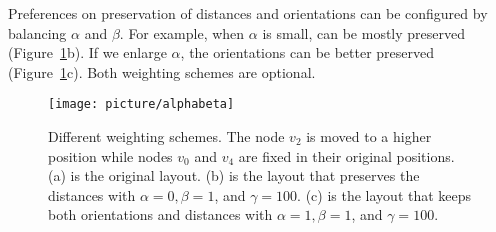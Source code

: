 Preferences on preservation of distances and orientations can be configured by balancing $\alpha$ and $\beta$. For example, when $\alpha$ is small,  can be mostly preserved (Figure~\ref{fig:alphabeta}b). If we enlarge $\alpha$, the orientations can be better preserved (Figure~\ref{fig:alphabeta}c). Both weighting schemes are optional.

\begin{figure}[t!p]
    \centering
    \setlength{\belowcaptionskip}{-5pt}
    \texttt{[image: picture/alphabeta]}
    \caption{Different weighting schemes. The node $v_2$ is moved to a higher position while nodes $v_0$ and $v_4$ are fixed in their original positions. (a) is the original layout. (b) is the layout that preserves the distances with $\alpha=0, \beta=1$, and $\gamma=100$. (c) is the layout that keeps both orientations and distances with $\alpha=1, \beta=1$, and $\gamma=100$.}
    \label{fig:alphabeta}
\end{figure}


